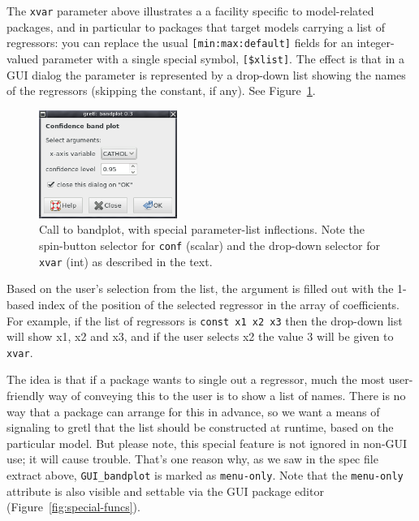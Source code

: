 \documentclass[oneside]{book}
\begin{document}
The \texttt{xvar} parameter above illustrates a a facility specific to
model-related packages, and in particular to packages that target
models carrying a list of regressors: you can replace the usual
\texttt{[min:max:default]} fields for an integer-valued parameter with
a single special symbol, \texttt{[\$xlist]}.  The effect is that in a
GUI dialog the parameter is represented by a drop-down list showing
the names of the regressors (skipping the constant, if any). See
Figure~\ref{fig:bandplot-call}.

\begin{figure}[htbp]
\begin{center}
  \includegraphics[width=0.4\textwidth]{figures/bandplot-call}
\end{center}
\caption{Call to \textsf{bandplot}, with special parameter-list
  inflections. Note the spin-button selector for \texttt{conf}
  (scalar) and the drop-down selector for \texttt{xvar} (int)
  as described in the text.}
\label{fig:bandplot-call}
\end{figure}

Based on the user's selection from the list, the argument is filled
out with the 1-based index of the position of the selected regressor
in the array of coefficients. For example, if the list of regressors
is \texttt{const x1 x2 x3} then the drop-down list will show
\textsf{x1}, \textsf{x2} and \textsf{x3}, and if the user selects
\textsf{x2} the value 3 will be given to \texttt{xvar}.

The idea is that if a package wants to single out a regressor, much
the most user-friendly way of conveying this to the user is to show a
list of names. There is no way that a package can arrange for this in
advance, so we want a means of signaling to gretl that the list should
be constructed at runtime, based on the particular model. But please
note, this special feature is not ignored in non-GUI use; it will
cause trouble. That's one reason why, as we saw in the spec file
extract above, \texttt{GUI\_bandplot} is marked as \texttt{menu-only}.
Note that the \texttt{menu-only} attribute is also visible and
settable via the GUI package editor (Figure~\ref{fig:special-funcs}).
\end{document}
